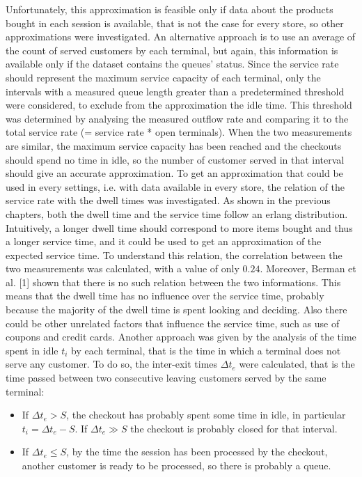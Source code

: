 Unfortunately, this approximation is feasible only if data about the products bought in each session is available, that is not the case for every store, so other approximations were investigated.
An alternative approach is to use an average of the count of served customers by each terminal, but again, this information is available only if the dataset contains the queues’ status. Since the service rate should represent the maximum service capacity of each terminal, only the intervals with a measured queue length greater than a predetermined threshold were considered, to exclude from the approximation the idle time. This threshold was determined by analysing the measured outflow rate and comparing it to the total service rate (= service rate * open terminals). When the two measurements are similar, the maximum service capacity has been reached and the checkouts should spend no time in idle, so the number of customer served in that interval should give an accurate approximation.
To get an approximation that could be used in every settings, i.e. with data available in every store, the relation of the service rate with the dwell times was investigated. As shown in the previous chapters, both the dwell time and the service time follow an erlang distribution. Intuitively, a longer dwell time should correspond to more items bought and thus a longer service time, and it could be used to get an approximation of the expected service time. To understand this relation, the correlation between the two measurements was calculated, with a value of only $ 0.24 $. Moreover, Berman et al. [1] shown that there is no such relation between the two informations. This means that the dwell time has no influence over the service time, probably because the majority of the dwell time is spent looking and deciding. Also there could be other unrelated factors that influence the service time, such as use of coupons and credit cards.
Another approach was given by the analysis of the time spent in idle $ t_i $ by each terminal, that is the time in which a terminal does not serve any customer. To do so, the inter-exit times $ \Delta t_e $ were calculated, that is the time passed between two consecutive leaving customers served by the same terminal:
\begin{itemize}
  \item If $ \Delta t_e > S $, the checkout has probably spent some time in idle, in particular $ t_i = \Delta t_e - S $. If $ \Delta t_e \gg S $ the checkout is probably closed for that interval.
  \item If $ \Delta t_e \le S $, by the time the session has been processed by the checkout, another customer is ready to be processed, so there is probably a queue.
\end{itemize}

